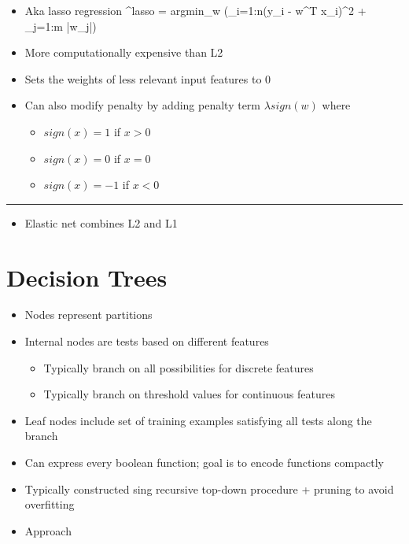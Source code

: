 \documentclass[12pt]{article}
\newcommand{\abs}[1]{\left|#1\right|}
\newcommand{\divider}[0]{\par\textcolor{lightgray}{\rule{\textwidth}{0.1pt}}}
\newenvironment{eqn}{\equation\alignedat{3}}{\endalignedat\endequation}
\begin{document}
\begin{itemize}
	\item Aka lasso regression
	\begin{eqn}
		^{lasso} = argmin_w (\Sigma_{i=1:n}(y_i - w^T x_i)^2 + \lambda \Sigma_{j=1:m} \abs{w_j})
	\end{eqn}
	\item More computationally expensive than L2
	\item Sets the weights of less relevant input features to 0
	\item Can also modify penalty by adding penalty term $\lambda sign(w)$ where 
	\begin{itemize}
		\item $sign(x) = 1$ if $x > 0$
		\item $sign(x) = 0$ if $x = 0$
		\item $sign(x) = -1$ if $x < 0$
	\end{itemize}
\end{itemize}

\divider

\begin{itemize}
	\item Elastic net combines L2 and L1
\end{itemize}

\section{Decision Trees}

\begin{itemize}
	\item Nodes represent partitions
	\item Internal nodes are tests based on different features
	\begin{itemize}
		\item Typically branch on all possibilities for discrete features
		\item Typically branch on threshold values for continuous features
	\end{itemize}
	\item Leaf nodes include set of training examples satisfying all tests along the branch
	\item Can express every boolean function; goal is to encode functions compactly
	\item Typically constructed sing recursive top-down procedure + pruning to avoid overfitting
	\item Approach
\end{itemize}
\end{document}
